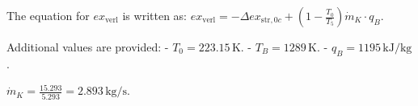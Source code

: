The equation for \( ex_{\text{verl}} \) is written as:  
\( ex_{\text{verl}} = -\Delta ex_{\text{str},0c} + \left( 1 - \frac{T_0}{T_5} \right) \dot{m}_K \cdot q_B \).  

Additional values are provided:  
- \( T_0 = 223.15 \, \text{K} \).  
- \( T_B = 1289 \, \text{K} \).  
- \( q_B = 1195 \, \text{kJ}/\text{kg} \).  

\( \dot{m}_K = \frac{15.293}{5.293} = 2.893 \, \text{kg/s} \).
